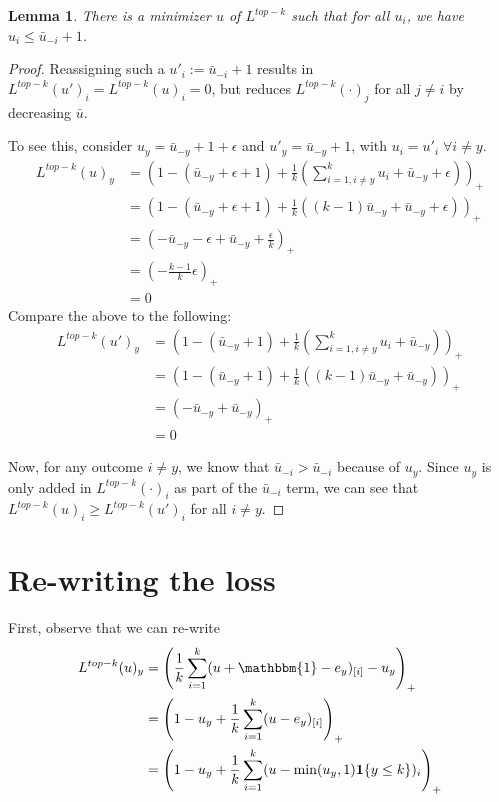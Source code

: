 \documentclass[12pt]{article}
\newcommand{\ubar}{\bar{u}}
\newcommand{\ones}{\mathbbm{1}}
\newcommand{\Ind}[1]{\mathbf{1}\{#1\}}
\newtheorem{lemma}{Lemma}
\begin{document}
\begin{lemma}\label{lem:top-threshold}
	There is a minimizer $u$ of $L^{top-k}$ such that for all $u_i$, we have $u_i \leq \bar u_{-i} +1$. 
\end{lemma}
\begin{proof}
	Reassigning such a $u'_i := \bar u_{-i} +1$ results in $L^{top-k}(u')_i = L^{top-k}(u)_i = 0$, but reduces $L^{top-k}(\cdot)_j$ for all $j \neq i$ by decreasing $\ubar$.

To see this, consider $u_y = \bar u_{-y} + 1 + \epsilon$ and $u'_y = \bar u_{-y} + 1$, with $u_i = u'_i \; \forall i \neq y$. 
\begin{align*}
L^{top-k}(u)_y &= \left(1 - (\bar u_{-y} + \epsilon + 1) + \frac 1 k \left(\sum_{i=1, i \neq y}^k u_i + \bar u_{-y} + \epsilon\right) \right)_+\\ 
&= \left(1 - (\bar u_{-y} + \epsilon + 1) + \frac 1 k \left((k-1) \bar u_{-y} + \bar u_{-y} + \epsilon\right) \right)_+\\
&= \left(-\bar u_{-y} - \epsilon + \bar u_{-y} + \frac \epsilon k \right)_+ \\
&= (-\frac{k-1}{k}\epsilon)_+\\
&= 0
\end{align*}
Compare the above to the following:
\begin{align*}
L^{top-k}(u')_y &= \left(1 - (\bar u_{-y} + 1) + \frac 1 k \left(\sum_{i=1, i \neq y}^k u_i + \bar u_{-y} \right) \right)_+\\ 
&= \left(1 - (\bar u_{-y} + 1) + \frac 1 k \left((k-1) \bar u_{-y} + \bar u_{-y} \right) \right)_+\\
&= \left(-\bar u_{-y} + \bar u_{-y}\right)_+ \\
&= 0
\end{align*}

Now, for any outcome $i \neq y$, we know that $\bar u_{-i} > \bar u_{-i}$ because of $u_y$.
Since $u_y$ is only added in $L^{top-k}(\cdot)_i$ as part of the $\bar u_{-i}$ term, we can see that $L^{top-k}(u)_i \geq L^{top-k}(u')_i$ for all $i \neq y$.
\end{proof}

\section{Re-writing the loss}

First, observe that we can re-write
\begin{align*} 
L^{top-k}(u)_y&=\left(\frac{1}{k} \sum_{i=1}^k (u + \ones - e_y)_{[i]} - u_y \right)_+\\ 
&=\left(1 - u_y + \frac{1}{k} \sum_{i=1}^k (u - e_y)_{[i]} \right)_+\\
&=\left(1 - u_y + \frac{1}{k} \sum_{i=1}^k (u - \min(u_y, 1)\Ind{y \leq k})_{i} \right)_+
\end{align*}
\end{document}
